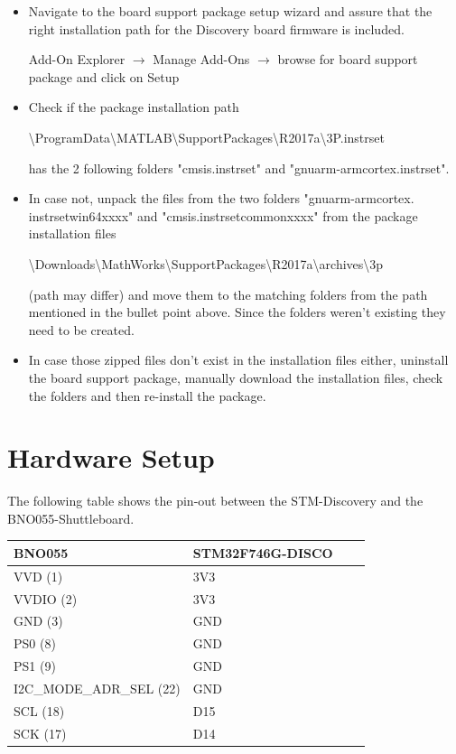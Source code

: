 \documentclass[a4paper]{article}
\begin{document}
\begin{itemize}

\item Navigate to the board support package setup wizard and assure that the right installation path for the Discovery board firmware is included.

Add-On Explorer $\rightarrow$ Manage Add-Ons $\rightarrow$ browse for board support package and click on Setup



\item Check if the package installation path 

\textbackslash ProgramData\textbackslash MATLAB\textbackslash SupportPackages\textbackslash R2017a\textbackslash 3P.instrset 

has the 2 following folders "cmsis.instrset" and "gnuarm-armcortex.instrset".

\item In case not, unpack the files from the two folders
"gnuarm-armcortex. instrset\textunderscore win64\textunderscore xxxx" and "cmsis.instrset\textunderscore common\textunderscore xxxx" from the package installation files

\textbackslash Downloads\textbackslash MathWorks\textbackslash SupportPackages\textbackslash R2017a\textbackslash archives\textbackslash 3p

(path may differ) and move them to the matching folders from the path mentioned in the bullet point above. Since the folders weren't existing they need to be created.

\item In case those zipped files don't exist in the  installation files either, uninstall the board support package, manually download the installation files, check the folders and then re-install the package.   

\end{itemize}
 

\section{Hardware Setup} \label{hardware}

The following table shows the pin-out between the STM-Discovery and the BNO055-Shuttleboard.

 
   \begin{center}        
    \begin{tabular}{ | l | l | l | p{5cm} |}
    \hline
    BNO055 & STM32F746G-DISCO \\ \hline
    VVD (1) & 3V3 \\ \hline
    VVDIO (2) & 3V3 \\ \hline
    GND (3) & GND \\ \hline
    PS0 (8) & GND \\ \hline
    PS1 (9) & GND \\ \hline
    I2C\_MODE\_ADR\_SEL (22) & GND \\ \hline
    SCL (18) & D15 \\ \hline
    SCK (17) & D14 \\ \hline
    \end{tabular}
    \end{center}
      
\end{document}
